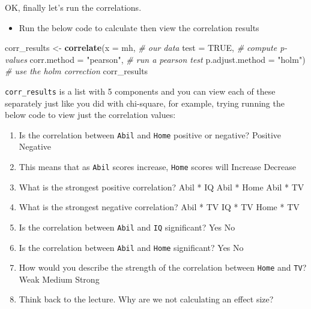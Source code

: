 \documentclass[]{book}
\newenvironment{Shaded}{\begin{snugshade}}{\end{snugshade}}
\newcommand{\CommentTok}[1]{\textcolor[rgb]{0.56,0.35,0.01}{\textit{#1}}}
\newcommand{\DataTypeTok}[1]{\textcolor[rgb]{0.13,0.29,0.53}{#1}}
\newcommand{\KeywordTok}[1]{\textcolor[rgb]{0.13,0.29,0.53}{\textbf{#1}}}
\newcommand{\NormalTok}[1]{#1}
\newcommand{\OperatorTok}[1]{\textcolor[rgb]{0.81,0.36,0.00}{\textbf{#1}}}
\newcommand{\OtherTok}[1]{\textcolor[rgb]{0.56,0.35,0.01}{#1}}
\newcommand{\StringTok}[1]{\textcolor[rgb]{0.31,0.60,0.02}{#1}}
\providecommand{\tightlist}{%
  \setlength{\itemsep}{0pt}\setlength{\parskip}{0pt}}
\begin{document}
OK, finally let's run the correlations.

\begin{itemize}
\tightlist
\item
  Run the below code to calculate then view the correlation results
\end{itemize}

\begin{Shaded}
\begin{Highlighting}[]
\NormalTok{corr_results <-}\StringTok{ }\KeywordTok{correlate}\NormalTok{(}\DataTypeTok{x =}\NormalTok{ mh, }\CommentTok{# our data}
                          \DataTypeTok{test =} \OtherTok{TRUE}\NormalTok{, }\CommentTok{# compute p-values}
                          \DataTypeTok{corr.method =} \StringTok{"pearson"}\NormalTok{, }\CommentTok{# run a pearson test }
                          \DataTypeTok{p.adjust.method =} \StringTok{"holm"}\NormalTok{) }\CommentTok{# use the holm correction}
\NormalTok{corr_results}
\end{Highlighting}
\end{Shaded}

\texttt{corr\_results} is a list with 5 components and you can view each of these separately just like you did with chi-square, for example, trying running the below code to view just the correlation values:

\begin{Shaded}
\end{Shaded}

\begin{enumerate}
\def\labelenumi{\arabic{enumi}.}
\tightlist
\item
  Is the correlation between \texttt{Abil} and \texttt{Home} positive or negative? Positive Negative
\item
  This means that as \texttt{Abil} scores increase, \texttt{Home} scores will Increase Decrease
\item
  What is the strongest positive correlation? Abil * IQ Abil * Home Abil * TV
\item
  What is the strongest negative correlation? Abil * TV IQ * TV Home * TV
\item
  Is the correlation between \texttt{Abil} and \texttt{IQ} significant? Yes No
\item
  Is the correlation between \texttt{Abil} and \texttt{Home} significant? Yes No
\item
  How would you describe the strength of the correlation between \texttt{Home} and \texttt{TV}? Weak Medium Strong
\item
  Think back to the lecture. Why are we not calculating an effect size?
\end{enumerate}
\end{document}
